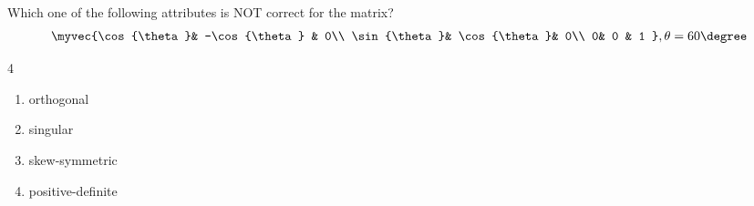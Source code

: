 \item  Which one of the following attributes is NOT correct for the matrix? 
 \hfill{}
 \begin{align*}
\myvec{\cos{\theta}& -\cos{\theta} & 0\\ \sin{\theta}& \cos{\theta}& 0\\ 0& 0 & 1
 },  \theta=60\degree
  \end{align*}
\begin {multicols}{4}
\begin{enumerate}
\item orthogonal
\item  singular 
\item skew-symmetric 
\item positive-definite 
\end{enumerate}
\end{multicols}
